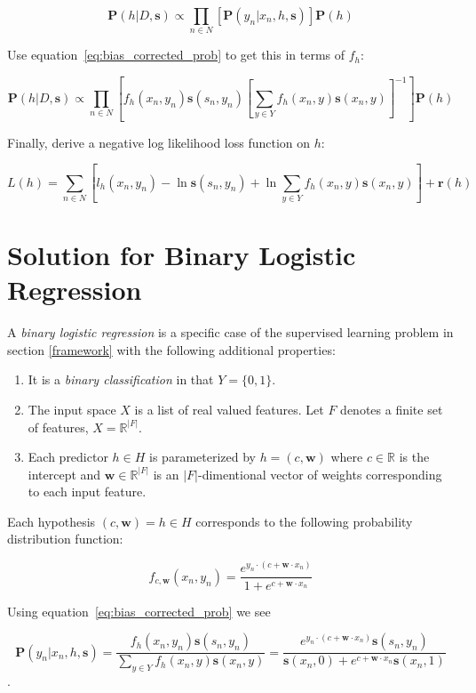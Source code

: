 \documentclass[twoside]{article}
\begin{document}
\[\mathbf{P}(h|D,\mathbf{s})\propto\prod_{n \in N} \left[\mathbf{P}(y_n|x_n,h,\mathbf{s})\right]\mathbf{P}(h)\]

Use equation~\eqref{eq:bias_corrected_prob} to get this in terms of \(f_h\):

\[\mathbf{P}(h|D,\mathbf{s})\propto\prod_{n \in N} \left[f_h(x_n,y_n)\mathbf{s}(s_n,y_n)\left [\sum_{y \in Y}f_h(x_n,y)\mathbf{s}(x_n,y) \right ]^{-1} \right]\mathbf{P}(h)\]

Finally, derive a negative log likelihood loss function on \(h\):

\[L(h)= \sum_{n \in N} \left[l_h(x_n,y_n)-\ln\mathbf{s}(s_n,y_n)+\ln\sum_{y \in Y}f_h(x_n,y)\mathbf{s}(x_n,y) \right] +\mathbf{r}(h)\]

\section{Solution for Binary Logistic Regression}
\label{section:logistic}

A \textit{binary logistic regression} is a specific case of the supervised learning problem in section \ref{framework} with the following additional properties:
\begin{enumerate}
	\item It is a \textit{binary classification} in that \(Y = \{0, 1\}\).
	\item The input space \(X\) is a list of real valued features. Let \(F\) denotes a finite set of features, \(X = \mathbb{R} ^{|F|}\).
	\item Each predictor \(h \in H\) is parameterized by \(h = (c, \mathbf{w})\) where \(c \in \mathbb{R}\) is the intercept and \(\mathbf{w} \in \mathbb{R}^{|F|}\) is an \(|F|\)-dimentional vector of weights corresponding to each input feature.
\end{enumerate}

Each hypothesis \((c, \mathbf{w})=h \in H\) corresponds to the following probability distribution function:

\[f_{c,\mathbf{w}}(x_n, y_n)=\frac{e^{y_n \cdot (c+\mathbf{w} \cdot x_n)}}{1+e^{c+\mathbf{w} \cdot x_n}}\]

Using equation~\eqref{eq:bias_corrected_prob} we see

\[\mathbf{P}(y_n|x_n,h,\mathbf{s})=\frac{f_h(x_n,y_n)\mathbf{s}(s_n,y_n)}{\sum_{y \in Y}f_h(x_n,y)\mathbf{s}(x_n,y)}=\frac{e^{y_n \cdot (c+\mathbf{w} \cdot x_n)}\mathbf{s}(s_n,y_n)}{\mathbf{s}(x_n,0)+e^{c+\mathbf{w} \cdot x_n}\mathbf{s}(x_n,1)} \].
\end{document}
